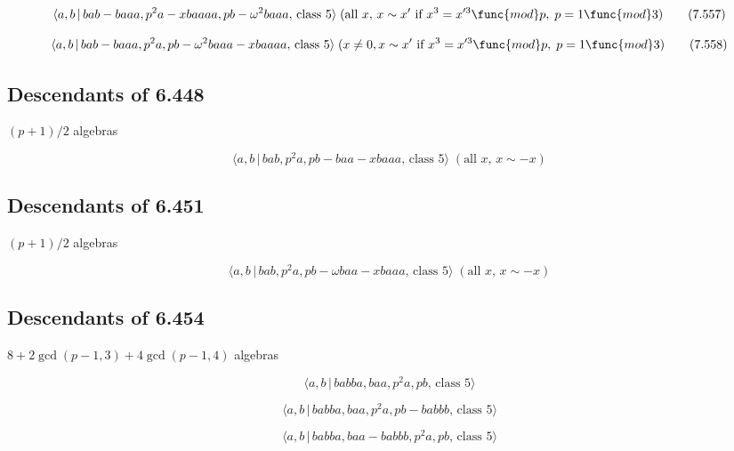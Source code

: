 \documentclass[10pt]{article}
\begin{document}
\begin{equation}
\langle a,b\,|\,bab-baaa,p^{2}a-xbaaaa,pb-\omega ^{2}baaa,\,\text{class }%
5\rangle \;(\text{all }x,\,x \sim x^{\prime }\text{ if }x^3=x^{\prime 3}%
\func{mod}p,\;p=1\func{mod}3)  \tag{7.557}
\end{equation}

\begin{equation}
\langle a,b\,|\,bab-baaa,p^{2}a,pb-\omega ^{2}baaa-xbaaaa,\,\text{class }%
5\rangle \;(x\neq 0,x \sim x^{\prime }\text{ if }x^3=x^{\prime 3}\func{mod}%
p,\;p=1\func{mod}3)  \tag{7.558}
\end{equation}

\subsection{Descendants of 6.448}

$(p+1)/2$ algebras

\begin{equation}
\langle a,b\,|\,bab,p^{2}a,pb-baa-xbaaa,\,\text{class }5\rangle \;(\text{all 
}x,\,x\sim -x)  \tag{7.559}
\end{equation}

\subsection{Descendants of 6.451}

$(p+1)/2$ algebras

\begin{equation}
\langle a,b\,|\,bab,p^{2}a,pb-\omega baa-xbaaa,\,\text{class }5\rangle \;(%
\text{all }x,\,x\sim -x)  \tag{7.560}
\end{equation}

\subsection{Descendants of 6.454}

$8+2\gcd (p-1,3)+4\gcd (p-1,4)$ algebras

\begin{equation}
\langle a,b\,|\,babba,baa,p^2a,pb,\,\text{class }5\rangle  \tag{7.561}
\end{equation}

\begin{equation}
\langle a,b\,|\,babba,baa,p^2a,pb-babbb,\,\text{class }5\rangle  \tag{7.562}
\end{equation}

\begin{equation}
\langle a,b\,|\,babba,baa-babbb,p^2a,pb,\,\text{class }5\rangle  \tag{7.563}
\end{equation}
\end{document}
